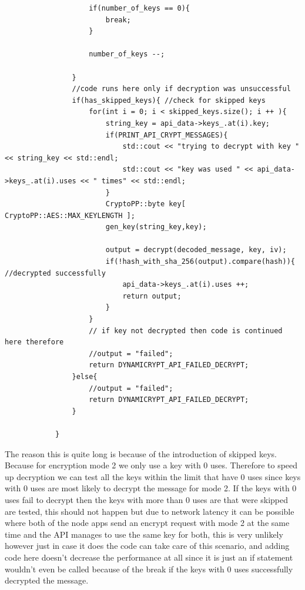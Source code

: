 \begin{lstlisting}
                    if(number_of_keys == 0){
                        break;
                    }

                    number_of_keys --;
                
                }
                //code runs here only if decryption was unsuccessful
                if(has_skipped_keys){ //check for skipped keys
                    for(int i = 0; i < skipped_keys.size(); i ++ ){
                        string_key = api_data->keys_.at(i).key;
                        if(PRINT_API_CRYPT_MESSAGES){
                            std::cout << "trying to decrypt with key " << string_key << std::endl;
                            std::cout << "key was used " << api_data->keys_.at(i).uses << " times" << std::endl;
                        }
                        CryptoPP::byte key[ CryptoPP::AES::MAX_KEYLENGTH ];
                        gen_key(string_key,key);

                        output = decrypt(decoded_message, key, iv);
                        if(!hash_with_sha_256(output).compare(hash)){ //decrypted successfully
                            api_data->keys_.at(i).uses ++;
                            return output;
                        }
                    }
                    // if key not decrypted then code is continued here therefore
                    //output = "failed";
                    return DYNAMICRYPT_API_FAILED_DECRYPT;
                }else{
                    //output = "failed";
                    return DYNAMICRYPT_API_FAILED_DECRYPT;
                }

            }
\end{lstlisting} 
The reason this is quite long is because of the introduction of skipped keys. Because for encryption mode 2 we only use a key with 0 uses. Therefore to speed up decryption we can test all the keys within the limit that have 0 uses since keys with 0 uses are most likely to decrypt the message for mode 2. 
If the keys with 0 uses fail to decrypt then the keys with more than 0 uses are that were skipped are tested, this should not happen but due to network latency it can be possible where both of the node apps send an encrypt request with mode 2 at the same time and the API manages to use the same key for both, this is very unlikely however just in case it does the code can take care of this scenario, and adding code here doesn't decrease the performance at all since it is just an if statement wouldn't even be called because of the break if the keys with 0 uses successfully decrypted the message. 

